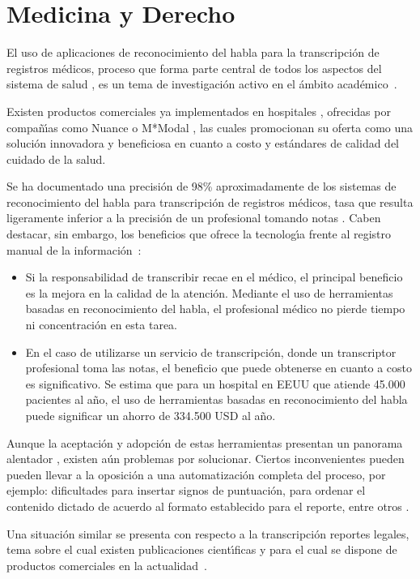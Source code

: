 \section{Medicina y Derecho}
\label{sec:medicina}

El uso de aplicaciones de reconocimiento del habla para la transcripci\'on de registros m\'edicos, proceso 
que forma parte central de todos los aspectos del sistema de salud \cite{DavidListening2009}, 
es un tema de investigaci\'on activo en el \'ambito \mbox{acad\'emico \cite{LaiMedSpeak1997, HappeCombining2002}}.

Existen productos comerciales ya implementados en hospitales \cite{USATodayHospitals}, ofrecidas por compa\~n{\'\i}as 
como Nuance \cite{NuanceOptimizing, NuanceSpeech} o M*Modal \cite{MmodalSpeech}, las cuales promocionan su oferta 
como una soluci\'on innovadora y beneficiosa en cuanto a costo y est\'andares de calidad del cuidado de la salud.

Se ha documentado una precisi\'on de 98\% aproximadamente de los sistemas de reconocimiento del habla para 
transcripci\'on de registros m\'edicos, tasa que resulta ligeramente inferior a la precisi\'on de un 
profesional tomando notas \cite{ZickVoice2001}. Caben destacar, sin embargo, los beneficios que ofrece 
la tecnolog{\'\i}a frente al registro manual de la \mbox{informaci\'on \cite{ZickVoice2001}}:

\begin{itemize}
	\item Si la responsabilidad de transcribir recae en el m\'edico, el principal beneficio es la mejora en 
	la calidad de la atenci\'on.
	Mediante el uso de herramientas basadas en reconocimiento del habla, el profesional m\'edico no pierde 
	tiempo ni concentraci\'on en esta tarea.
	\item En el caso de utilizarse un servicio de transcripci\'on, donde un transcriptor profesional toma las notas,
	el beneficio que puede obtenerse en cuanto a costo es significativo. Se estima que para un 
	hospital en EEUU que atiende 45.000 pacientes al a\~no, el uso de herramientas basadas en reconocimiento 
	del habla puede significar un ahorro de 334.500 USD al a\~no.
\end{itemize}

Aunque la aceptaci\'on y adopci\'on de estas herramientas presentan un panorama alentador \cite{GrassoLong2003}, 
existen a\'un problemas por solucionar. Ciertos inconvenientes pueden pueden llevar a 
la oposici\'on a una automatizaci\'on completa del proceso, por ejemplo: dificultades para insertar 
signos de puntuaci\'on, para ordenar el contenido dictado de acuerdo al formato establecido para el reporte,
entre otros \cite{DavidListening2009}.

Una situaci\'on similar se presenta con respecto a la transcripci\'on reportes legales, 
tema sobre el cual existen publicaciones cient{\'\i}ficas \cite{van-leeuwen2008improving, FalavignaAutomatic2009} 
y para el cual se dispone de productos comerciales en la \mbox{actualidad \cite{NuanceLegal}}.

